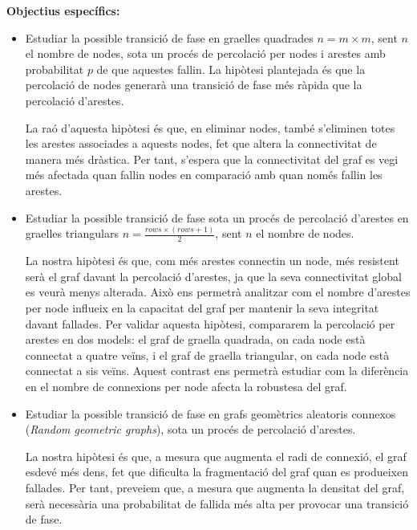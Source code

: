 \documentclass[a4paper]{article}
\begin{document}
	\textbf{Objectius específics:}
	\begin{itemize}
		\item Estudiar la possible transició de fase en graelles quadrades $n = m \times m$, sent $n$ el nombre de nodes, sota un procés de percolació per nodes i arestes amb probabilitat $p$ de que aquestes fallin. La hipòtesi plantejada és que la percolació de nodes generarà una transició de fase més ràpida que la percolació d'arestes. 
		
		\par La raó d'aquesta hipòtesi és que, en eliminar nodes, també s'eliminen totes les arestes associades a aquests nodes, fet que altera la connectivitat de manera més dràstica. Per tant, s'espera que la connectivitat del graf es vegi més afectada quan fallin nodes en comparació amb quan només fallin les arestes. \\
		
		\item Estudiar la possible transició de fase sota un procés de percolació d'arestes en graelles triangulars $n = \frac{rows \times (rows + 1)}{2}$, sent $n$ el nombre de nodes.
		
		\par La nostra hipòtesi és que, com més arestes connectin un node, més resistent serà el graf davant la percolació d'arestes, ja que la seva connectivitat global es veurà menys alterada. Això ens permetrà analitzar com el nombre d'arestes per node influeix en la capacitat del graf per mantenir la seva integritat davant fallades. Per validar aquesta hipòtesi, compararem la percolació per arestes en dos models: el graf de graella quadrada, on cada node està connectat a quatre veïns, i el graf de graella triangular, on cada node està connectat a sis veïns. Aquest contrast ens permetrà estudiar com la diferència en el nombre de connexions per node afecta la robustesa del graf. \\
		
		\item Estudiar la possible transició de fase en grafs geomètrics aleatoris connexos (\textit{Random geometric graphs}), sota un procés de percolació d’arestes.
		
		\par La nostra hipòtesi és que, a mesura que augmenta el radi de connexió, el graf esdevé més dens, fet que dificulta la fragmentació del graf quan es produeixen fallades. Per tant, preveiem que, a mesura que augmenta la densitat del graf, serà necessària una probabilitat de fallida més alta per provocar una transició de fase. \\
		

\end{itemize}
\end{document}
